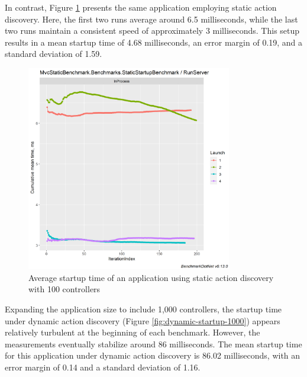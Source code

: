 In contrast, Figure \ref{fig:static-startup-100} presents the same application employing static action discovery. Here, the first two runs average around 6.5 milliseconds, while the last two runs maintain a consistent speed of approximately 3 milliseconds. This setup results in a mean startup time of 4.68 milliseconds, an error margin of 0.19, and a standard deviation of 1.59.

\begin{figure}[H]
\centering
\includegraphics[width=0.8\textwidth]{graphics/MvcStaticBenchmark.Benchmarks.StaticStartupBenchmark-RunServer-cummean.png}
\caption{Average startup time of an application using static action discovery with 100 controllers}
\label{fig:static-startup-100}
\end{figure}

Expanding the application size to include 1,000 controllers, the startup time under dynamic action discovery (Figure \ref{fig:dynamic-startup-1000}) appears relatively turbulent at the beginning of each benchmark. However, the measurements eventually stabilize around 86 milliseconds. The mean startup time for this application under dynamic action discovery is 86.02 milliseconds, with an error margin of 0.14 and a standard deviation of 1.16.

